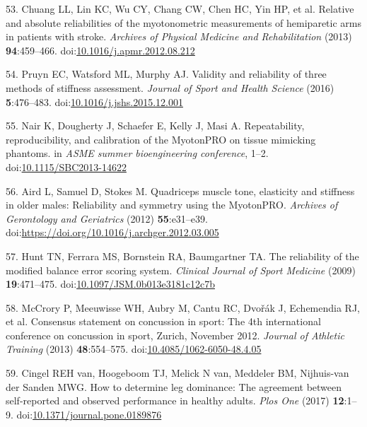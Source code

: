 \documentclass[
  english,
  man]{apa6}
\newenvironment{cslreferences}%
  {}%
  {\par}
\begin{document}
\begin{cslreferences}
\leavevmode\hypertarget{ref-Chuang2013}{}%
53. Chuang LL, Lin KC, Wu CY, Chang CW, Chen HC, Yin HP, et al. Relative and absolute reliabilities of the myotonometric measurements of hemiparetic arms in patients with stroke. \emph{Archives of Physical Medicine and Rehabilitation} (2013) \textbf{94}:459--466. doi:\href{https://doi.org/10.1016/j.apmr.2012.08.212}{10.1016/j.apmr.2012.08.212}

\leavevmode\hypertarget{ref-Pruyn2016}{}%
54. Pruyn EC, Watsford ML, Murphy AJ. Validity and reliability of three methods of stiffness assessment. \emph{Journal of Sport and Health Science} (2016) \textbf{5}:476--483. doi:\href{https://doi.org/10.1016/j.jshs.2015.12.001}{10.1016/j.jshs.2015.12.001}

\leavevmode\hypertarget{ref-Nair2014}{}%
55. Nair K, Dougherty J, Schaefer E, Kelly J, Masi A. Repeatability, reproducibility, and calibration of the MyotonPRO on tissue mimicking phantoms. in \emph{ASME summer bioengineering conference}, 1--2. doi:\href{https://doi.org/10.1115/SBC2013-14622}{10.1115/SBC2013-14622}

\leavevmode\hypertarget{ref-Aird2012}{}%
56. Aird L, Samuel D, Stokes M. Quadriceps muscle tone, elasticity and stiffness in older males: Reliability and symmetry using the MyotonPRO. \emph{Archives of Gerontology and Geriatrics} (2012) \textbf{55}:e31--e39. doi:\href{https://doi.org/https://doi.org/10.1016/j.archger.2012.03.005}{https://doi.org/10.1016/j.archger.2012.03.005}

\leavevmode\hypertarget{ref-Hunt2009}{}%
57. Hunt TN, Ferrara MS, Bornstein RA, Baumgartner TA. The reliability of the modified balance error scoring system. \emph{Clinical Journal of Sport Medicine} (2009) \textbf{19}:471--475. doi:\href{https://doi.org/10.1097/JSM.0b013e3181c12c7b}{10.1097/JSM.0b013e3181c12c7b}

\leavevmode\hypertarget{ref-McCrory2013}{}%
58. McCrory P, Meeuwisse WH, Aubry M, Cantu RC, Dvořák J, Echemendia RJ, et al. Consensus statement on concussion in sport: The 4th international conference on concussion in sport, Zurich, November 2012. \emph{Journal of Athletic Training} (2013) \textbf{48}:554--575. doi:\href{https://doi.org/10.4085/1062-6050-48.4.05}{10.4085/1062-6050-48.4.05}

\leavevmode\hypertarget{ref-VanCingel2017}{}%
59. Cingel REH van, Hoogeboom TJ, Melick N van, Meddeler BM, Nijhuis-van der Sanden MWG. How to determine leg dominance: The agreement between self-reported and observed performance in healthy adults. \emph{Plos One} (2017) \textbf{12}:1--9. doi:\href{https://doi.org/10.1371/journal.pone.0189876}{10.1371/journal.pone.0189876}


\end{cslreferences}
\end{document}
